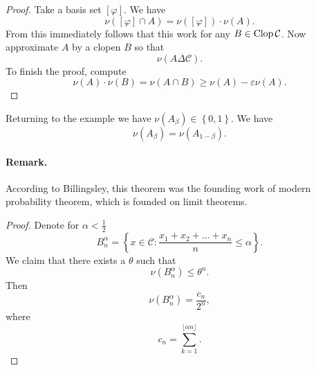 
\begin{proof}
Take a basis set \( \left[ \varphi \right] \). We have
\[ 
    \nu \left( \left[ \varphi \right] \cap A \right) = \nu \left( \left[ \varphi \right] \right) \cdot \nu(A).
\]
From this immediately follows that this work for any \( B \in \operatorname{Clop} \mathcal{C} \).
Now approximate \( A \) by a clopen \( B \) so that
\[ 
    \nu \left( A \Delta \mathcal{C} \right).
\]
To finish the proof, compute
\[ 
    \nu(A) \cdot \nu(B) = \nu( A \cap B ) \geqslant \nu(A) -\varepsilon\nu(A). 
\]
\end{proof}

Returning to the example we have \( \nu(A_\beta) \in \left\{ 0,1 \right\} \). We have
\[ 
    \nu(A_\beta) = \nu (A_{1-\beta}).
\]


\paragraph{Remark.} According to Billingsley, this theorem was the founding work of modern probability theorem, which is founded on limit theorems.

\begin{proof}
Denote for \( \alpha < \frac{1}{2} \)
\[ 
    B_n^\alpha =  \left\{ x \in \mathcal{C} : \frac{x_1 + x_2 + \ldots + x_n}{n} \leqslant \alpha \right\}.
\]
We claim that there exists a \( \theta \) such that
\[ 
 \nu \left( B_n^\alpha \right) \leqslant \theta^n.
\]
Then 
\[ 
    \nu \left( B_n^\alpha \right) = \frac{c_n}{2^n},
\]
where
\[ 
    c_n = \sum_{k=1}^{ \lfloor \alpha n \rfloor }.
\]
\end{proof}
